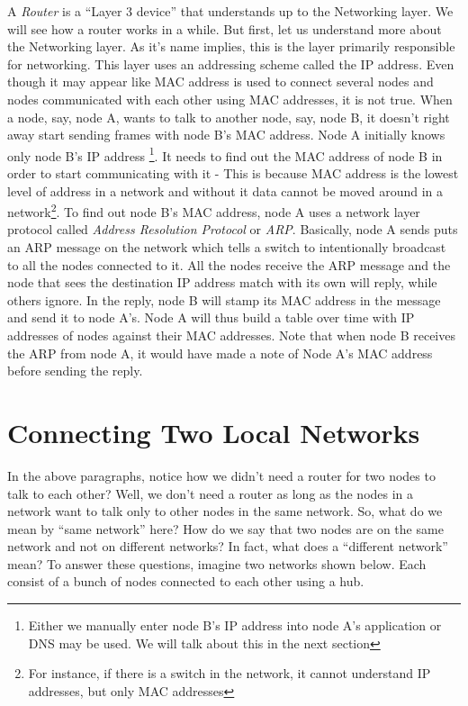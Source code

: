 A \emph{Router} is a ``Layer 3 device'' that understands up to the Networking layer. We will see how a router works in a while. But first, let us understand more about the Networking layer. As it's name implies, this is the layer primarily responsible for networking. This layer uses an addressing scheme called the IP address. Even though it may appear like MAC address is used to connect several nodes and nodes communicated with each other using MAC addresses, it is not true. When a node, say, node A, wants to talk to another node, say, node B, it doesn't right away start sending frames with node B's MAC address. Node A initially knows only node B's IP address \footnote{Either we manually enter node B's IP address into node A's application or DNS may be used. We will talk about this in the next section}. It needs to find out the MAC address of node B in order to start communicating with it - This is because MAC address is the lowest level of address in a network and without it data cannot be moved around in a network\footnote{For instance, if there is a switch in the network, it cannot understand IP addresses, but only MAC addresses}. To find out node B's MAC address, node A uses a network layer protocol called \emph{Address Resolution Protocol}  or \emph{ARP}. Basically, node A sends puts an ARP message on the network which tells a switch to intentionally broadcast to all the nodes connected to it. All the nodes receive the ARP message and the node that sees the destination IP address match with its own will reply, while others ignore. In the reply, node B will stamp its MAC address in the message and send it to node A's. Node A will thus build a table over time with IP addresses of nodes against their MAC addresses. Note that when node B receives the ARP from node A, it would have made a note of Node A's MAC address before sending the reply.

\section{Connecting Two Local Networks}
In the above paragraphs, notice how we didn't need a router for two nodes to talk to each other? Well, we don't need a router as long as the nodes in a network want to talk only to other nodes in the same network. So, what do we mean by ``same network'' here? How do we say that two nodes are on the same network and not on different networks? In fact, what does a ``different network'' mean? To answer these questions, imagine two networks shown below. Each consist of a bunch of nodes connected to each other using a hub.

